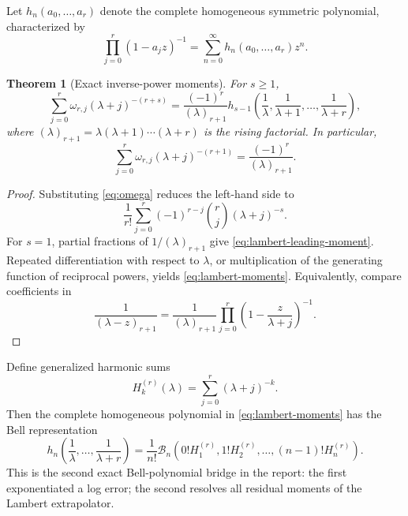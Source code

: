 \documentclass[11pt]{article}
\newtheorem{theorem}{Theorem}[section]
\theoremstyle{definition}
\theoremstyle{remark}
\begin{document}
Let $h_n(a_0,\ldots,a_r)$ denote the complete homogeneous symmetric polynomial, characterized by
\begin{equation}
\prod_{j=0}^{r}(1-a_jz)^{-1}
=\sum_{n=0}^{\infty}h_n(a_0,\ldots,a_r)z^n.
\label{eq:complete-homogeneous}
\end{equation}

\begin{theorem}[Exact inverse-power moments]
\label{thm:lambert-moments}
For $s\ge1$,
\begin{equation}
\sum_{j=0}^{r}\omega_{r,j}(\lambda+j)^{-(r+s)}
=\frac{(-1)^r}{(\lambda)_{r+1}}
 h_{s-1}\!\left(\frac1\lambda,\frac1{\lambda+1},\ldots,
\frac1{\lambda+r}\right),
\label{eq:lambert-moments}
\end{equation}
where $(\lambda)_{r+1}=\lambda(\lambda+1)\cdots(\lambda+r)$ is the rising factorial. In particular,
\begin{equation}
\sum_{j=0}^{r}\omega_{r,j}(\lambda+j)^{-(r+1)}
=\frac{(-1)^r}{(\lambda)_{r+1}}.
\label{eq:lambert-leading-moment}
\end{equation}
\end{theorem}

\begin{proof}
Substituting \cref{eq:omega} reduces the left-hand side to
\[
\frac1{r!}\sum_{j=0}^{r}(-1)^{r-j}\binom{r}{j}(\lambda+j)^{-s}.
\]
For $s=1$, partial fractions of $1/(\lambda)_{r+1}$ give \cref{eq:lambert-leading-moment}. Repeated differentiation with respect to $\lambda$, or multiplication of the generating function of reciprocal powers, yields \cref{eq:lambert-moments}. Equivalently, compare coefficients in
\[
\frac{1}{(\lambda-z)_{r+1}}
=\frac{1}{(\lambda)_{r+1}}
\prod_{j=0}^{r}\left(1-\frac{z}{\lambda+j}\right)^{-1}.
\]
\end{proof}

Define generalized harmonic sums
\begin{equation}
H_k^{(r)}(\lambda)=\sum_{j=0}^{r}(\lambda+j)^{-k}.
\label{eq:Hrk}
\end{equation}
Then the complete homogeneous polynomial in \cref{eq:lambert-moments} has the Bell representation
\begin{equation}
h_n\!\left(\frac1\lambda,\ldots,\frac1{\lambda+r}\right)
=\frac1{n!}\mathcal B_n\!\left(
0!H_1^{(r)},1!H_2^{(r)},\ldots,(n-1)!H_n^{(r)}
\right).
\label{eq:h-Bell}
\end{equation}
This is the second exact Bell-polynomial bridge in the report: the first exponentiated a log error; the second resolves all residual moments of the Lambert extrapolator.
\end{document}
